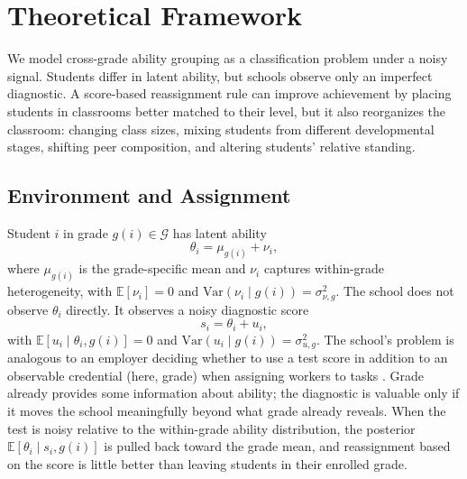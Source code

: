 \documentclass[11pt]{article}
\newcommand{\E}{\mathbb{E}}
\begin{document}
\section{Theoretical Framework}
\label{sec:theory}

We model cross-grade ability grouping as a classification problem under a noisy signal. Students differ in latent ability, but schools observe only an imperfect diagnostic. A score-based reassignment rule can improve achievement by placing students in classrooms better matched to their level, but it also reorganizes the classroom: changing class sizes, mixing students from different developmental stages, shifting peer composition, and altering students' relative standing.

\subsection{Environment and Assignment}

Student $i$ in grade $g(i) \in \mathcal{G}$ has latent ability
\begin{equation}
\label{eq:ability}
\theta_i = \mu_{g(i)} + \nu_i,
\end{equation}
where $\mu_{g(i)}$ is the grade-specific mean and $\nu_i$ captures within-grade heterogeneity, with $\E[\nu_i] = 0$ and $\text{Var}(\nu_i \mid g(i)) = \sigma^2_{\nu,g}$. The school does not observe $\theta_i$ directly. It observes a noisy diagnostic score
\begin{equation}
\label{eq:score}
s_i = \theta_i + u_i,
\end{equation}
with $\E[u_i \mid \theta_i, g(i)] = 0$ and $\text{Var}(u_i \mid g(i)) = \sigma^2_{u,g}$. The school's problem is analogous to an employer deciding whether to use a test score in addition to an observable credential (here, grade) when assigning workers to tasks \citep{AutorScarborough2008}. Grade already provides some information about ability; the diagnostic is valuable only if it moves the school meaningfully beyond what grade already reveals. When the test is noisy relative to the within-grade ability distribution, the posterior $\E[\theta_i \mid s_i, g(i)]$ is pulled back toward the grade mean, and reassignment based on the score is little better than leaving students in their enrolled grade.
\end{document}
